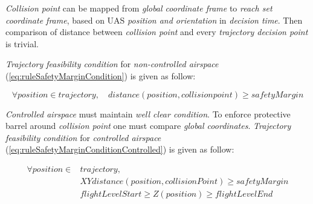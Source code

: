 \emph{Collision point} can be mapped from \emph{global coordinate frame} to \emph{reach set coordinate frame}, based on UAS \emph{position and orientation} in \emph{decision time}. Then comparison of distance between \emph{collision point} and every \emph{trajectory decision point} is trivial. 

\emph{Trajectory feasibility condition}  for \emph{non-controlled airspace} (\ref{eq:ruleSafetyMarginCondition}) is given as follow:

\begin{equation}\label{eq:ruleSafetyMarginCondition}
    \forall position \in trajectory, \quad distance(position,collision point) \ge safetyMargin
\end{equation}

\noindent\emph{Controlled airspace} must maintain \emph{well clear condition}. To enforce protective barrel around \emph{collision point} one must compare \emph{global coordinates}.
\emph{Trajectory feasibility condition}  for \emph{controlled airspace} (\ref{eq:ruleSafetyMarginConditionControlled}) is given as follow:

\begin{equation}\label{eq:ruleSafetyMarginConditionControlled}
    \begin{aligned}
        \forall position \in &trajectory,\\
        &XYdistance(position,collisionPoint) \ge safetyMargin\\
        &flightLevelStart \ge Z(position) \ge flightLevelEnd
    \end{aligned}
\end{equation}

